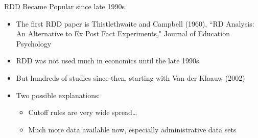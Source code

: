\documentclass[hyperref={pdfpagelabels=false}]{beamer}
\begin{document}
\begin{frame}{RDD Became Popular since late 1990s }{}
	
	\begin{itemize}
		\item The first RDD paper is Thistlethwaite and Campbell (1960), ``RD Analysis: An Alternative to Ex Post Fact
		Experiments," Journal of Education Psychology
		\vspace{0.2cm}
		\item RDD was not used much in economics until the late 1990s
		\vspace{0.2cm}
		\item But hundreds of studies since then, starting with Van der Klaauw (2002)
		\vspace{0.2cm}
		\item Two possible explanations:
		\vspace{0.2cm}
		\begin{itemize}
			\item Cutoff rules are very wide spread…
			\vspace{0.2cm}
			\item Much more data available now, especially administrative data sets
		\end{itemize}
		
	\end{itemize}
\end{frame}
\end{document}
